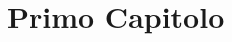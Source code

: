 \thispagestyle{empty} %
\cleardoublepage

\thispagestyle{empty}

\clearpage{\pagestyle{plain}\cleardoublepage}


\clearpage{\pagestyle{plain}\cleardoublepage}
\tableofcontents %

\clearpage{\pagestyle{plain}\cleardoublepage} %

\clearpage{\pagestyle{plain}\cleardoublepage} %
\chapter{Primo Capitolo} %
\label{chapter:primo_capitolo} %
